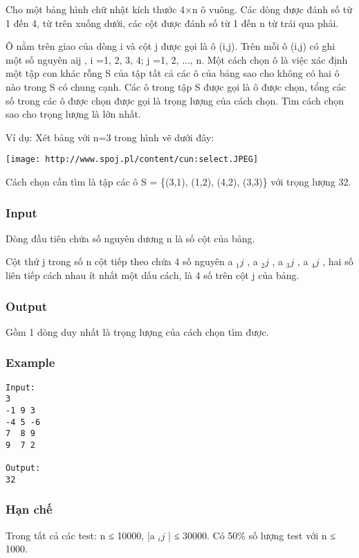

Cho một bảng hình chữ nhật kích thước 4×n ô vuông. Các dòng được đánh số từ 1 đến 4, từ trên xuống dưới, các cột được đánh số từ 1 đến n từ trái qua phải.

Ô nằm trên giao của dòng i và cột j được gọi là ô (i,j). Trên mỗi ô (i,j) có ghi một số nguyên aij , i =1, 2, 3, 4; j =1, 2, ..., n. Một cách chọn ô là việc xác định một tập con khác rỗng S của tập tất cả các ô của bảng sao cho không có hai ô nào trong S có chung cạnh. Các ô trong tập S được gọi là ô được chọn, tổng các số trong các ô được chọn được gọi là trọng lượng của cách chọn. Tìm cách chọn sao cho trọng lượng là lớn nhất.

Ví dụ: Xét bảng với n=3 trong hình vẽ dưới đây:


\texttt{[image: http://www.spoj.pl/content/cun:select.JPEG]}

Cách chọn cần tìm là tập các ô S = \{(3,1), (1,2), (4,2), (3,3)\} với trọng lượng 32.

\subsubsection{Input}

Dòng đầu tiên chứa số nguyên dương n là số cột của bảng.

Cột thứ j trong số n cột tiếp theo chứa 4 số nguyên a $_ 1j $ , a $_ 2j $ , a $_ 3j $ , a $_ 4j $ , hai số liên tiếp cách nhau ít nhất một dấu cách, là 4 số trên cột j của bảng.

\subsubsection{Output}

Gồm 1 dòng duy nhất là trọng lượng của cách chọn tìm được.

\subsubsection{Example}
\begin{verbatim}
Input:
3
-1 9 3
-4 5 -6
7  8 9
9  7 2

Output:
32

\end{verbatim}

\subsubsection{Hạn chế}

Trong tất cả các test: n ≤ 10000, |a $_ ij $ | ≤ 30000. Có 50\% số lượng test với n ≤ 1000.
